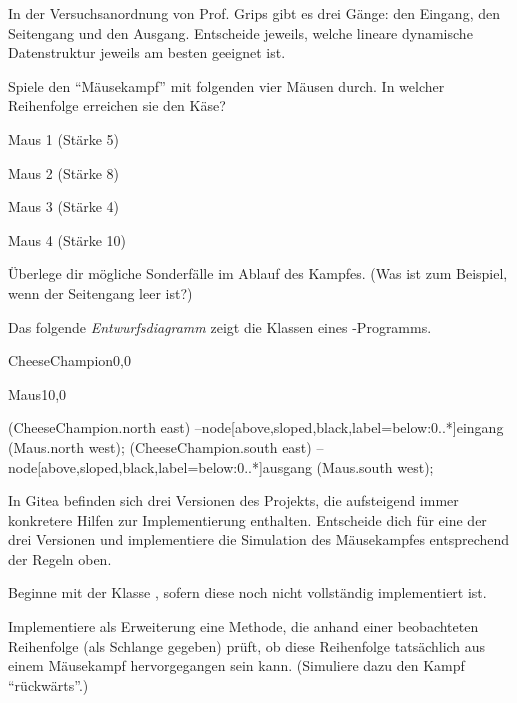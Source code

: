 \documentclass[10pt, a4paper, ngerman]{arbeitsblatt}
\begin{document}
\begin{aufgabe}
\begin{teilaufgaben}
	\teilaufgabe
	In der Versuchsanordnung von Prof. Grips gibt es drei Gänge: den Eingang, den Seitengang und den Ausgang. Entscheide jeweils, welche lineare dynamische Datenstruktur jeweils am besten geeignet ist.

	\teilaufgabe
	Spiele den \enquote{Mäusekampf} mit folgenden vier Mäusen durch. In welcher Reihenfolge erreichen sie den Käse?

	\begin{multicols}{4}
		Maus 1 (Stärke 5)

		Maus 2 (Stärke 8)

		Maus 3 (Stärke 4)

		Maus 4 (Stärke 10)
	\end{multicols}

	Überlege dir mögliche Sonderfälle im Ablauf des Kampfes. (Was ist zum Beispiel, wenn der Seitengang leer ist?)

	\teilaufgabe
	Das folgende \emph{Entwurfsdiagramm} zeigt die Klassen eines -Programms.

	\begin{center}
		\begin{klassendiagramm}
			\begin{class}[text width=3cm]{CheeseChampion}{0,0}
			\end{class}
			\begin{class}[text width=3cm]{Maus}{10,0}
			\end{class}
			 (CheeseChampion.north east) --node[above,sloped,black,label=below:0..*]{eingang} (Maus.north west);
			 (CheeseChampion.south east) --node[above,sloped,black,label=below:0..*]{ausgang} (Maus.south west);
		\end{klassendiagramm}
	\end{center}

	In Gitea befinden sich drei Versionen des Projekts, die aufsteigend immer konkretere Hilfen zur Implementierung enthalten. Entscheide dich für eine der drei Versionen und implementiere die Simulation des Mäusekampfes entsprechend der Regeln oben.

	Beginne mit der Klasse , sofern diese noch nicht vollständig implementiert ist.

	\teilaufgabe
	Implementiere als Erweiterung eine Methode, die anhand einer beobachteten Reihenfolge (als Schlange gegeben) prüft, ob diese Reihenfolge tatsächlich aus einem Mäusekampf hervorgegangen sein kann. (Simuliere dazu den Kampf \enquote{rückwärts}.)
\end{teilaufgaben}
\end{aufgabe}
\end{document}
